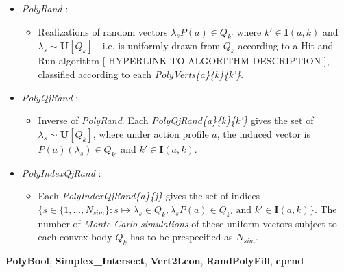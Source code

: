 \documentclass[a4paper,10pt,english]{sphinxmanual}
\begin{document}
{\begin{minipage}{0.95\linewidth}
\begin{fulllineitems}
\begin{itemize}
\begin{itemize}
\end{itemize}

\item {} 
\emph{PolyRand} :
\begin{itemize}
\item {} 
Realizations of random vectors \(\lambda_{s}P(a) \in Q_{k'}\) where \(k' \in \mathbf{I}(a,k)\) and \(\lambda_{s} \sim \textbf{U}[Q_{k}]\)---i.e. is uniformly drawn  from \(Q_{k}\) according to a Hit-and-Run algorithm {[} HYPERLINK TO ALGORITHM DESCRIPTION {]}, classified according to each \emph{PolyVerts\{a\}\{k\}\{k'\}}.

\end{itemize}

\item {} 
\emph{PolyQjRand} :
\begin{itemize}
\item {} 
Inverse of \emph{PolyRand}. Each \emph{PolyQjRand\{a\}\{k\}\{k'\}} gives the set of \(\lambda_{s} \sim \textbf{U}[Q_{k}]\), where under action profile \(a\), the induced vector is \(P(a)(\lambda_{s}) \in Q_{k'}\) and \(k' \in \mathbf{I}(a,k)\).

\end{itemize}

\item {} 
\emph{PolyIndexQjRand} :
\begin{itemize}
\item {} 
Each \emph{PolyIndexQjRand\{a\}\{j\}} gives the set of indices \(\{
s \in \{1,...,N_{sim}\} : s \mapsto \lambda_{s} \in Q_{k}, \lambda_{s}P(a) \in Q_{k'}  \text{ and } k' \in \mathbf{I}(a,k)  \}\). The number of \emph{Monte Carlo simulations} of these uniform vectors subject to each convex body \(Q_k\) has to be prespecified as \(N_{sim}\).

\end{itemize}

\end{itemize}

\end{fulllineitems}





\textbf{PolyBool}, \textbf{Simplex\_Intersect}, \textbf{Vert2Lcon}, \textbf{RandPolyFill}, \textbf{cprnd}


\end{minipage}}
\begin{center}\setlength{\fboxsep}{5pt}\end{center}
\end{document}
